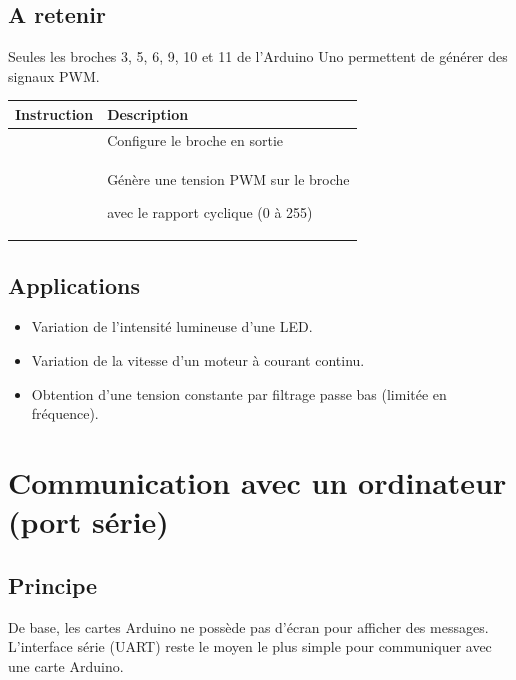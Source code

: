 \documentclass[a4paper,10pt,french]{book}
\begin{document}
\subsection{A retenir}
\label{\detokenize{3_bases/2_pwm_led:a-retenir}}
Seules les broches 3, 5, 6, 9, 10 et 11 de l’Arduino Uno permettent de générer des signaux PWM.


\begin{savenotes}\sphinxattablestart
\centering
\begin{tabulary}{\linewidth}[t]{|T|T|}
\hline
\sphinxstyletheadfamily 
Instruction
&\sphinxstyletheadfamily 
Description
\\
\hline
{}
&
Configure le broche  en sortie
\\
\hline
{}
&
Génère une tension PWM sur le broche 

avec le rapport cyclique  (0 à 255)
\\
\hline
\end{tabulary}
\par
\sphinxattableend\end{savenotes}


\subsection{Applications}
\label{\detokenize{3_bases/2_pwm_led:applications}}\begin{itemize}
\item {} 
Variation de l’intensité lumineuse d’une LED.

\item {} 
Variation de la vitesse d’un moteur à courant continu.

\item {} 
Obtention d’une tension constante par filtrage passe bas (limitée en fréquence).

\end{itemize}


\section{Communication avec un ordinateur (port série)}
\label{\detokenize{3_bases/3_communication_serie:communication-avec-un-ordinateur-port-serie}}\label{\detokenize{3_bases/3_communication_serie::doc}}

\subsection{Principe}
\label{\detokenize{3_bases/3_communication_serie:principe}}
De base, les cartes Arduino ne possède pas d’écran pour afficher des messages. L’interface série (UART) reste le moyen le plus simple pour communiquer avec une carte Arduino.
\end{document}
